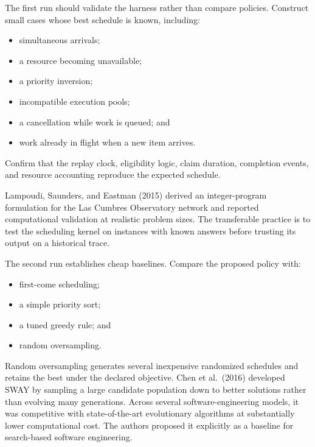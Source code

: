 
The first run should validate the harness rather than compare policies. Construct small cases whose best schedule is known, including:

\begin{itemize}
\tightlist
\item
  simultaneous arrivals;
\item
  a resource becoming unavailable;
\item
  a priority inversion;
\item
  incompatible execution pools;
\item
  a cancellation while work is queued; and
\item
  work already in flight when a new item arrives.
\end{itemize}

Confirm that the replay clock, eligibility logic, claim duration, completion events, and resource accounting reproduce the expected schedule.

Lampoudi, Saunders, and Eastman (2015) derived an integer-program formulation for the Las Cumbres Observatory network and reported computational validation at realistic problem sizes. The transferable practice is to test the scheduling kernel on instances with known answers before trusting its output on a historical trace.


The second run establishes cheap baselines. Compare the proposed policy with:

\begin{itemize}
\tightlist
\item
  first-come scheduling;
\item
  a simple priority sort;
\item
  a tuned greedy rule; and
\item
  random oversampling.
\end{itemize}

Random oversampling generates several inexpensive randomized schedules and retains the best under the declared objective. Chen et al.~(2016) developed SWAY by sampling a large candidate population down to better solutions rather than evolving many generations. Across several software-engineering models, it was competitive with state-of-the-art evolutionary algorithms at substantially lower computational cost. The authors proposed it explicitly as a baseline for search-based software engineering.

